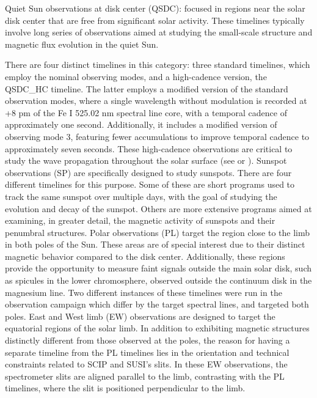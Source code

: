 \begin{itemize}
  \Myitem Quiet Sun observations at disk center (QSDC): focused in regions near the solar disk center that are free from significant solar activity. These timelines typically involve long series of observations aimed at studying the small-scale structure and magnetic flux evolution in the quiet Sun. 
  
  There are four distinct timelines in this category: three standard timelines, which employ the nominal observing modes, and a high-cadence version, the QSDC{\_}HC timeline. The latter employs a modified version of the standard observation modes, where a single wavelength without modulation is recorded at +8 pm of the Fe I 525.02 nm spectral line core, with a temporal cadence of approximately one second. Additionally, it includes a modified version of observing mode 3, featuring fewer accumulations to improve temporal cadence to approximately seven seconds. These high-cadence observations are critical to study the wave propagation throughout the solar surface (see \citealt{acoustic-waves} or \citealt{acoustic-waves-2}).    
  \Myitem Sunspot observations (SP) are specifically designed to study sunspots. There are four different timelines for this purpose. Some of these are short programs used to track the same sunspot over multiple days, with the goal of studying the evolution and decay of the sunspot. Others are more extensive programs aimed at examining, in greater detail, the magnetic activity of sunspots and their penumbral structures.
  \Myitem Polar observations (PL) target the region close to the limb in both poles of the Sun. These areas are of special interest due to their distinct magnetic behavior compared to the disk center. Additionally, these regions provide the opportunity to measure faint signals outside the main solar disk, such as spicules in the lower chromosphere, observed outside the continuum disk in the magnesium line. Two different instances of these timelines were run in the observation campaign which differ by the target spectral lines, and targeted both poles. 
  \Myitem East and West limb (EW) observations are designed to target the equatorial regions of the solar limb. In addition to exhibiting magnetic structures distinctly different from those observed at the poles, the reason for having a separate timeline from the PL timelines lies in the orientation and technical constraints related to SCIP and SUSI's slits. In these EW observations, the spectrometer slits are aligned parallel to the limb, contrasting with the PL timelines, where the slit is positioned perpendicular to the limb.

\end{itemize}
